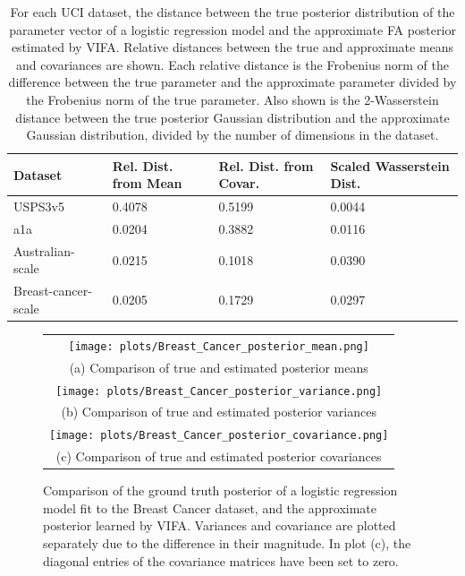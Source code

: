 \documentclass[10pt]{article} %
\begin{document}
\begin{table}[!h]
\caption{For each UCI dataset, the distance between the true posterior distribution of the parameter vector of a logistic regression model and the approximate FA posterior estimated by VIFA. Relative distances between the true and approximate means and covariances are shown. Each relative distance is the Frobenius norm of the difference between the true parameter and the approximate parameter divided by the Frobenius norm of the true parameter. Also shown is the 2-Wasserstein distance between the true posterior Gaussian distribution and the approximate Gaussian distribution, divided by the number of dimensions in the dataset.}
\label{table:logistic_regression_vi_posterior_uci}
\begin{center}
\begin{tabular}{l|lll}
\textbf{Dataset}    & \textbf{Rel. Dist. from Mean} & \textbf{Rel. Dist. from Covar.} & \textbf{Scaled Wasserstein Dist.} \\ \hline
USPS3v5             & 0.4078                        & 0.5199                          & 0.0044                            \\
a1a                 & 0.0204                        & 0.3882                          & 0.0116                            \\
Australian-scale    & 0.0215                        & 0.1018                          & 0.0390                            \\
Breast-cancer-scale & 0.0205                        & 0.1729                          & 0.0297                           
\end{tabular}
\end{center}
\end{table}


\begin{figure}[!htbp] 
	\begin{tabular}{c}
		\texttt{[image: plots/Breast\_Cancer\_posterior\_mean.png]} \\
		(a) Comparison of true and estimated posterior means \\[6pt] 
		 \texttt{[image: plots/Breast\_Cancer\_posterior\_variance.png]} \\
		(b) Comparison of true and estimated posterior variances \\[6pt] 
		\texttt{[image: plots/Breast\_Cancer\_posterior\_covariance.png]} \\
		(c) Comparison of true and estimated posterior covariances \\[6pt] 
	\end{tabular}
	\caption{Comparison of the ground truth posterior of a logistic regression model fit to the Breast Cancer dataset, and the approximate posterior learned by VIFA. Variances and covariance are plotted separately due to the difference in their magnitude. In plot (c), the diagonal entries of the covariance matrices have been set to zero.}
	\label{fig:posterior_Breast_Cancer}
\end{figure}
\end{document}
